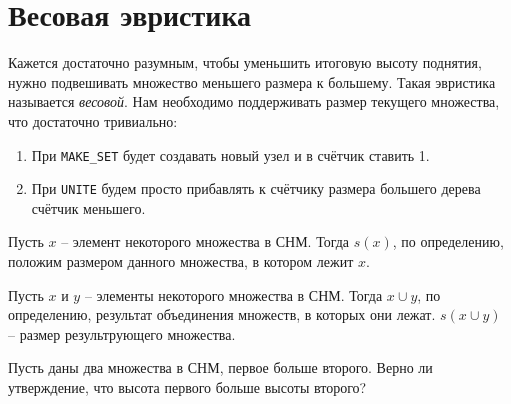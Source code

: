 
\section{Весовая эвристика}

Кажется достаточно разумным, чтобы уменьшить итоговую высоту поднятия, нужно подвешивать множество меньшего размера к большему.
Такая эвристика называется \textit{весовой}. Нам необходимо поддерживать размер текущего множества, что достаточно тривиально:
\begin{enumerate}
    \item При \texttt{MAKE\_SET} будет создавать новый узел и в счётчик ставить 1.
    \item При \texttt{UNITE} будем просто прибавлять к счётчику размера большего дерева счётчик меньшего.
\end{enumerate}

\Def Пусть $x$ -- элемент некоторого множества в СНМ. Тогда $s(x)$, по определению, положим размером данного множества, в котором лежит $x$.

\Def Пусть $x$ и $y$ -- элементы некоторого множества в СНМ. Тогда $x \cup y$, по определению, результат объединения множеств, в которых они лежат. $s(x \cup y)$ -- размер результрующего множества.

\Exe Пусть даны два множества в СНМ, первое больше второго. Верно ли утверждение, что высота первого больше высоты второго?

